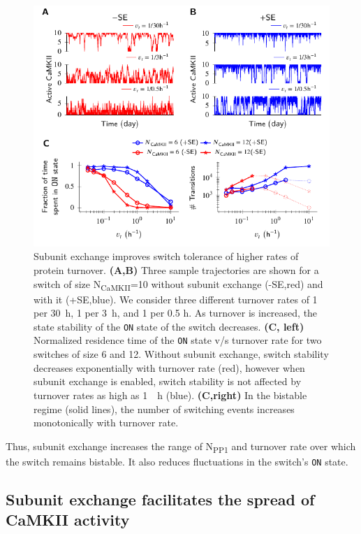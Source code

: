 \documentclass[9pt,lineno,doublespacing]{elife}
\newcommand\SUB[2]{#1\textsubscript{#2}}
\begin{document}
\begin{figure}[th!]
    \includegraphics[width=114mm]{./PaperFigures/elifeFigure3/figure_turnover_tolerance_114.pdf}
    \caption{Subunit exchange improves switch tolerance of higher rates of
        protein turnover.
        \textbf{(A,B)} Three sample trajectories are shown for a switch of 
        size \SUB{N}{CaMKII}=10 without subunit exchange
        (-SE,red) and with it (+SE,blue). We consider three different 
        turnover rates of 1 per \SI{30}{\hour}, 1 per \SI{3}{\hour}, 
        and 1 per 0.5 \si{\hour}. As turnover is increased, the state stability 
        of the \texttt{ON} state of the switch decreases.
        \textbf{(C, left)} Normalized residence time of the \texttt{ON} state v/s turnover
        rate for two switches of size 6 and 12. Without subunit exchange, switch
        stability decreases exponentially with turnover rate (red), however when
        subunit exchange is enabled, switch stability is not affected by
        turnover rates as high as \SI{1}{\per \hour} (blue). \textbf{(C,right)} In
        the bistable regime (solid lines), the number of switching events
        increases monotonically with turnover rate.
    }\label{fig:turnover}
\end{figure}

Thus, subunit exchange increases the range of \SUB{N}{PP1} and turnover rate
over which the switch remains bistable. It also reduces fluctuations in the
switch's \texttt{ON} state.

\subsection{Subunit exchange facilitates the spread of CaMKII activity}
\label{res:spread_activity}
\end{document}
